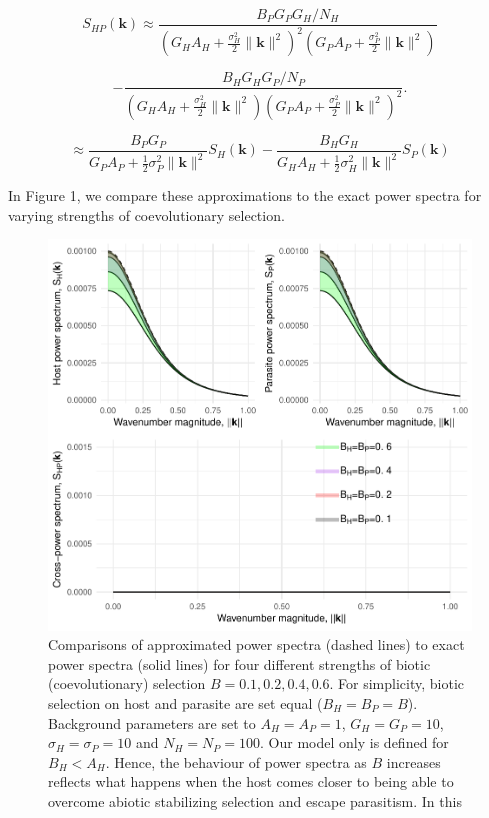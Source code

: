 \documentclass{article}
\begin{document}
\[S_{HP}(\pmb k)\approx\frac{B_PG_PG_H/N_H}{\left(G_HA_H+\frac{\sigma_H^2}{2}\|\pmb k\|^2\right)^2\left(G_PA_P+\frac{\sigma_P^2}{2}\|\pmb k\|^2\right)}\]

\[-\frac{B_HG_HG_P/N_P}{\left(G_HA_H+\frac{\sigma_H^2}{2}\|\pmb k\|^2\right)\left(G_PA_P+\frac{\sigma_P^2}{2}\|\pmb k\|^2\right)^2}.\]

\[\approx\frac{B_PG_P}{G_PA_P+\frac{1}{2}\sigma_P^2\|\pmb k\|^2}S_H(\pmb k)-\frac{B_HG_H}{G_HA_H+\frac{1}{2}\sigma_H^2\|\pmb k\|^2}S_P(\pmb k)\]

In Figure 1, we compare these approximations to the exact power spectra
for varying strengths of coevolutionary selection.

\begin{figure}
\centering
\includegraphics{Spatial-Scales-of-Local-Adaptation-in-Host-Parasite-Coevolution_files/figure-latex/unnamed-chunk-1-1.pdf}
\caption{Comparisons of approximated power spectra (dashed lines) to
exact power spectra (solid lines) for four different strengths of biotic
(coevolutionary) selection \(B=0.1,0.2,0.4,0.6\). For simplicity, biotic
selection on host and parasite are set equal (\(B_H=B_P=B\)). Background
parameters are set to \(A_H=A_P=1\), \(G_H=G_P=10\),
\(\sigma_H=\sigma_P=10\) and \(N_H=N_P=100\). Our model only is defined
for \(B_H<A_H\). Hence, the behaviour of power spectra as \(B\)
increases reflects what happens when the host comes closer to being able
to overcome abiotic stabilizing selection and escape parasitism. In this
}
\end{figure}
\end{document}
